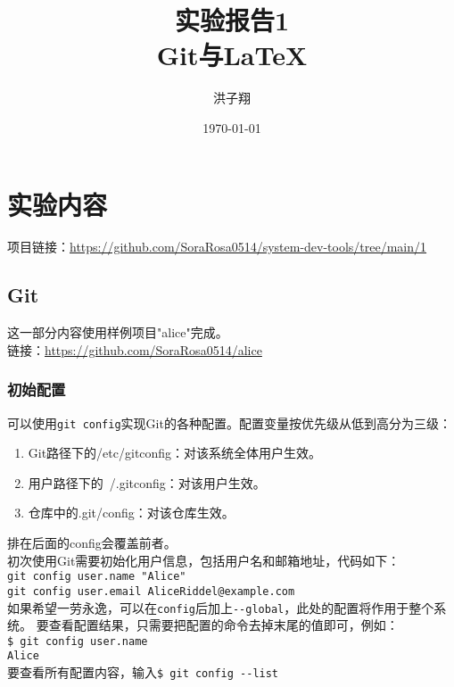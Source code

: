 \documentclass[a4paper, 12pt]{article}
\title{实验报告1\\Git与\LaTeX}
\author{洪子翔}
\date{\today}
\begin{document}
\maketitle
\newpage
\tableofcontents
\newpage

\section{实验内容}

    项目链接：\href{https://github.com/SoraRosa0514/system-dev-tools/tree/main/1}{https://github.com/SoraRosa0514/system-dev-tools/tree/main/1}
	\subsection{Git}
    这一部分内容使用样例项目"alice"完成。\\
    链接：\href{https://github.com/SoraRosa0514/alice}{https://github.com/SoraRosa0514/alice}
    	\subsubsection{初始配置}
            可以使用\verb|git config|实现Git的各种配置。配置变量按优先级从低到高分为三级：
            \begin{enumerate}
                \item Git路径下的/etc/gitconfig：对该系统全体用户生效。
                \item  用户路径下的~/.gitconfig：对该用户生效。
                \item 仓库中的.git/config：对该仓库生效。
            \end{enumerate}
            排在后面的config会覆盖前者。\\
            初次使用Git需要初始化用户信息，包括用户名和邮箱地址，代码如下：\\
            \verb|git config user.name "Alice"|\\
            \verb|git config user.email AliceRiddel@example.com|\\
            如果希望一劳永逸，可以在\verb|config|后加上\verb|--global|，此处的配置将作用于整个系统。
            要查看配置结果，只需要把配置的命令去掉末尾的值即可，例如：\\
            \verb|$ git config user.name|\\
            \verb|Alice|\\
            要查看所有配置内容，输入\verb|$ git config --list|
            
\end{document}

